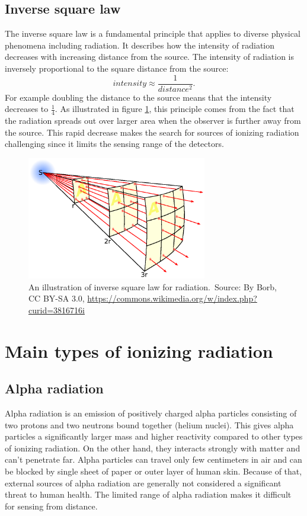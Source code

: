   \subsection{Inverse square law}%
The inverse square law is a fundamental principle that applies to diverse physical phenomena including radiation.
It describes how the intensity of radiation decreases with increasing distance from the source.
The intensity of radiation is inversely proportional to the square distance from the source:
\begin{equation}
  intensity \approx \frac{1}{distance^2}.
\end{equation}
For example doubling the distance to the source means that the intensity decreases to $\frac{1}{4}$.
As illustrated in figure \ref{fig:islaw}, this principle comes from the fact that the radiation spreads out over larger area when the observer is further away from the source.
This rapid decrease makes the search for sources of ionizing radiation challenging since it limits the sensing range of the detectors.

  \begin{figure}[!h]
    \centering
      \includegraphics[width=0.7\textwidth]{./fig/photos/Inverse_square_law.eps}
    \caption{An illustration of inverse square law for radiation.\ Source: By Borb, CC BY-SA 3.0, \url{https://commons.wikimedia.org/w/index.php?curid=3816716i}}
      \label{fig:islaw}
  \end{figure}

\section{Main types of ionizing radiation}
\subsection{Alpha radiation}
Alpha radiation is an emission of positively charged alpha particles consisting of two protons and two neutrons bound together (helium nuclei).
This gives alpha particles a significantly larger mass and higher reactivity compared to other types of ionizing radiation.
On the other hand, they interacts strongly with matter and can't penetrate far.
Alpha particles can travel only few centimeters in air and can be blocked by single sheet of paper or outer layer of human skin.
Because of that, external sources of alpha radiation are generally not considered a significant threat to human health.
The limited range of alpha radiation makes it difficult for sensing from distance.


